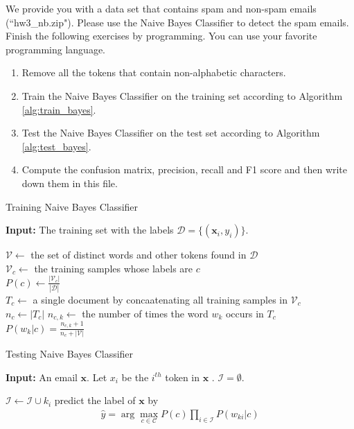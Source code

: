 \documentclass[11pt,letter,notitlepage]{article}
\begin{document}
\newpage
\begin{exercise}
We provide you with a data set that contains spam and non-spam emails (``hw3\_nb.zip"). Please use the Naive Bayes Classifier to detect the spam emails.
Finish the following exercises by programming. You can use your favorite programming language.
\begin{enumerate}
\item Remove all the tokens that contain non-alphabetic characters.
\item Train the Naive Bayes Classifier on the training set according to Algorithm \ref{alg:train_bayes}.
\item Test the Naive Bayes Classifier on the test set according to Algorithm \ref{alg:test_bayes}.
\item Compute the confusion matrix, precision, recall and F1 score and then write down them in this file.
\end{enumerate}

\end{exercise}

\begin{algorithm}
\caption{Training Naive Bayes Classifier}
\label{alg:train_bayes}
\textbf{Input:} The training set with the labels $\mathcal{D}=\{(\textbf{x}_i,y_i)\}.$
\begin{algorithmic}[1]
\STATE $\mathcal{V}\leftarrow$ the set of distinct words and other tokens found in $\mathcal{D}$\\
\STATE $\mathcal{V}_c\leftarrow$ the training samples whose labels are $c$\\
\STATE $P(c)\leftarrow\frac{|\mathcal{V}_c|}{|\mathcal{D}|}$\\
\STATE $T_c\leftarrow$ a single document by concaatenating all training samples in $\mathcal{V}_c$\\
\STATE $n_c\leftarrow |T_c|$
\STATE $n_{c,k}\leftarrow$ the number of times the word $w_k$ occurs in $T_c$\\
\STATE $P(w_k|c)=\frac{n_{c,k}+1}{n_c+|\mathcal{V}|}$
\ENDFOR
\ENDFOR
\end{algorithmic}
\end{algorithm}

\begin{algorithm}
\caption{Testing Naive Bayes Classifier }
\label{alg:test_bayes}
\textbf{Input:} An email $\textbf{x}$. Let $x_i$ be the $i^{th}$ token in $\textbf{x}$ . $\mathcal{I}=\emptyset.$
\begin{algorithmic}[1]
\STATE $\mathcal{I}\leftarrow\mathcal{I}\cup k_i$
\ENDIF
\ENDFOR
\STATE predict the label of $\textbf{x}$ by 
\begin{align*}
    \hat{y}=\arg\max_{c\in\mathcal{C}} P(c)\prod_{i\in\mathcal{I}}P(w_{ki}|c)
\end{align*}
\end{algorithmic}
\end{algorithm}
\end{document}
